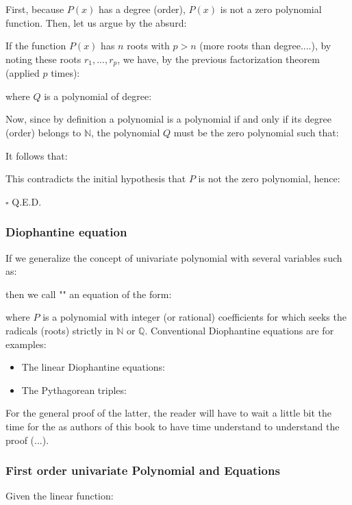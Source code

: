 	\begin{dem}
	First, because $P(x)$ has a degree (order), $P(x)$ is not a zero polynomial function. Then, let us argue by the absurd:
	
	If the function $P(x)$ has $n$ roots with $p>n$ (more roots than degree....), by noting these roots $r_1,...,r_p$, we have, by the previous  factorization theorem (applied $p$ times):
	
	where $Q$ is a polynomial of degree:
	
	Now, since by definition a polynomial is a polynomial if and only if its degree (order) belongs to  $\mathbb{N}$, the polynomial $Q$ must be the zero polynomial such that:
	
	It follows that:
	
	This contradicts the initial hypothesis that $P$ is not the zero polynomial, hence:
	
	\begin{flushright}
		$\square$  Q.E.D.
	\end{flushright}
	\end{dem}
	
	\subsubsection{Diophantine equation}\label{diophantine equation}
	If we generalize the concept of univariate polynomial with several variables such as:
	
	then we call "" an equation of the form:
	
	where $P$ is a polynomial with integer (or rational) coefficients for which seeks the radicals (roots) strictly in $\mathbb{N}$ or $\mathbb{Q}$. Conventional Diophantine equations are for examples:
	\begin{itemize}
		\item  The linear Diophantine equations:
		
		
		\item The Pythagorean triples:
			
	\end{itemize}
	For the general proof of the latter, the reader will have to wait a little bit the time for the as authors of this book to have time understand to understand the proof (...).
	
	\subsubsection{First order univariate Polynomial and Equations}
	Given the linear function:
	
